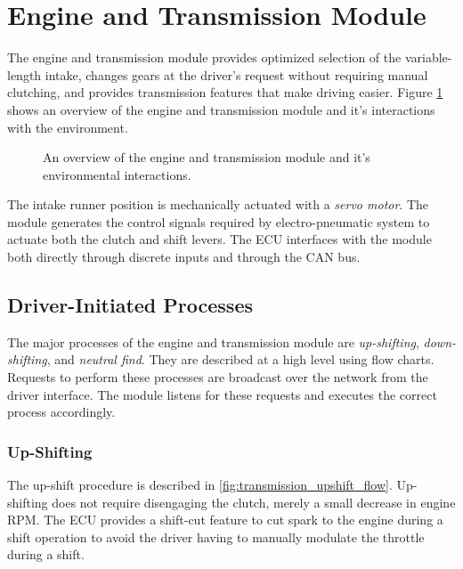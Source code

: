 \section{Engine and Transmission Module}

The engine and transmission module provides optimized selection of the variable-length intake, changes gears at the driver's request without requiring manual clutching, and provides transmission features that make driving easier. Figure \ref{fig:design_engine_overview_block} shows an overview of the engine and transmission module and it's interactions with the environment.

\begin{figure}[H]
	\centering
 	
	\caption{An overview of the engine and transmission module and it's environmental interactions.}
	\label{fig:design_engine_overview_block}
\end{figure}

The intake runner position is mechanically actuated with a \emph{servo motor}. The module generates the control signals required by electro-pneumatic system to actuate both the clutch and shift levers. The ECU interfaces with the module both directly through discrete inputs and through the CAN bus.

\subsection{Driver-Initiated Processes}

The major processes of the engine and transmission module are \emph{up-shifting}, \emph{down-shifting}, and \emph{neutral find}. They are described at a high level using flow charts. Requests to perform these processes are broadcast over the network from the driver interface. The module listens for these requests and executes the correct process accordingly.

\subsubsection{Up-Shifting}

The up-shift procedure is described in \ref{fig:transmission_upshift_flow}. Up-shifting does not require disengaging the clutch, merely a small decrease in engine RPM. The ECU provides a shift-cut feature to cut spark to the engine during a shift operation to avoid the driver having to manually modulate the throttle during a shift.

